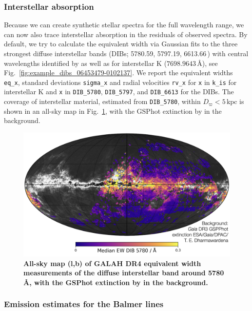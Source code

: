 \documentclass[
  journal=pasa,
  manuscript=research-paper, %
  year=2024,
  volume=37
]{cup-journal}
\newcommand{\Angstroem}{\,\text{\AA}}	%
\begin{document}
\subsubsection{Interstellar absorption}

Because we can create synthetic stellar spectra for the full wavelength range, we can now also trace interstellar absorption in the residuals of observed spectra. By default, we try to calculate the equivalent width via Gaussian fits to the three strongest diffuse interstellar bands (DIBs; 5780.59, 5797.19, 6613.66\Angstroem) with central wavelengths identified by \citet{Vogrincic2023} as well as for interstellar K ($7698.9643\,\text{\AA}$), see Fig.~\ref{fig:example_dibs_06453479-0102137}. We report the equivalent widths \texttt{eq\_x}, standard deviations \texttt{sigma\_x} and radial velocities \texttt{rv\_x} for \texttt{x} in \texttt{k\_is} for interstellar K and \texttt{x} in \texttt{DIB\_5780}, \texttt{DIB\_5797}, and \texttt{DIB\_6613} for the DIBs. The coverage of interstellar material, estimated from \texttt{DIB\_5780}, within $D_\varpi < 5\,\mathrm{kpc}$ is shown in an all-sky map in Fig.~\ref{fig:galah_dr4_dibs_gaia_dr3_extinction}, with the GSPhot extinction by \citet{Andrae2023} in the background.

\begin{figure}[ht]
 \centering
 \includegraphics[width=\textwidth]{figures/galah_dr4_dibs_gaia_dr3_extinction.png}
 \caption{\textbf{All-sky map (l,b) of GALAH DR4 equivalent width measurements of the diffuse interstellar band around 5780\,\AA, with the GSPhot extinction by \citet{Andrae2023} in the background.}}
 \label{fig:galah_dr4_dibs_gaia_dr3_extinction}
\end{figure}

\subsubsection{Emission estimates for the Balmer lines} \label{sec:emission}
\end{document}
